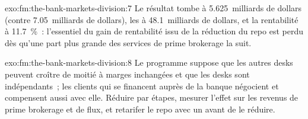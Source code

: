 \begin{solution}{exo:fm:the-bank-markets-division:7}
Le résultat tombe à 5.625~milliards de dollars (contre 7.05~milliards de dollars), les  à 48.1~milliards de dollars, et la rentabilité à 11.7~\%~: l'essentiel du gain de rentabilité issu de la réduction du
repo est perdu dès qu'une part plus grande des services de prime brokerage la suit.
\end{solution}

\begin{solution}{exo:fm:the-bank-markets-division:8}
Le programme suppose que les autres desks peuvent croître de moitié à marges inchangées et que les desks sont indépendants~; les clients qui se financent
auprès de la banque négocient et compensent aussi avec elle. Réduire par étapes, mesurer l'effet sur les revenus de prime brokerage et de flux, et retarifer le repo avec un 
avant de le réduire.
\end{solution}

